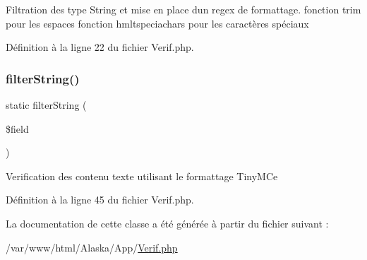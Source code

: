 Filtration des type String et mise en place d\textquotesingle{}un regex de formattage. fonction trim pour les espaces fonction hmltspeciachars pour les caractères spéciaux 

Définition à la ligne 22 du fichier Verif.\+php.

\mbox{\label{class_app_1_1_verif_a99f773813353109ce02b4796ddd49467}} 
\subsubsection{\texorpdfstring{filter\+String()}{filterString()}}
{\footnotesize\ttfamily static filter\+String (\begin{DoxyParamCaption}\item[{}]{\$field }\end{DoxyParamCaption})\hspace{0.3cm}{\ttfamily [static]}}

Verification des contenu texte utilisant le formattage Tiny\+M\+Ce 

Définition à la ligne 45 du fichier Verif.\+php.



La documentation de cette classe a été générée à partir du fichier suivant \+:\begin{DoxyCompactItemize}
\item 
/var/www/html/\+Alaska/\+App/\hyperlink{_verif_8php}{Verif.\+php}\end{DoxyCompactItemize}
